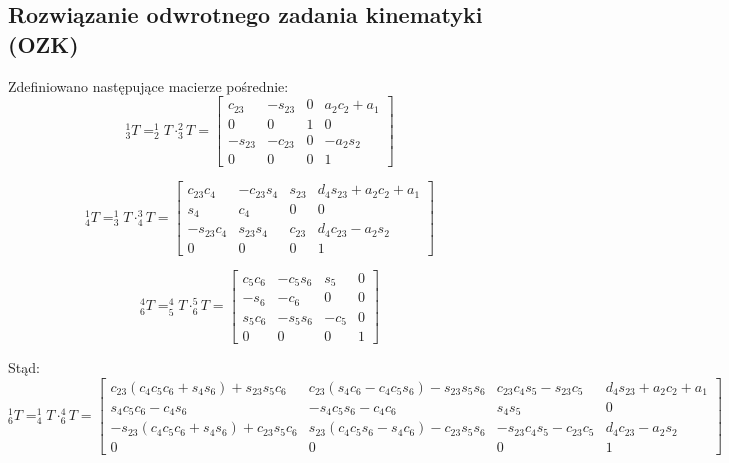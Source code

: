 \documentclass{article}
\begin{document}
\subsection{Rozwiązanie odwrotnego zadania kinematyki (OZK)}

Zdefiniowano następujące macierze po\'srednie:
\[
_{3}^{1}T= _{2}^{1}T \cdot _{3}^{2}T = 
\begin{bmatrix}
c_{23}	&-s_{23}	&0	&a_2c_2+a_1	\\
0		&0		&1	&0			\\
-s_{23}	&-c_{23}	&0	&-a_2s_2		\\
0		&0		&0	&1	
 \end{bmatrix}
\]

\[
_{4}^{1}T= _{3}^{1}T \cdot _{4}^{3}T = 
\begin{bmatrix}
c_{23}c_4	&-c_{23}s_4	&s_{23}	&d_4s_{23}+a_2c_2+a_1	\\
s_4		&c_4		&0		&0			\\
-s_{23}c_4	&s_{23}s_4	&c_{23}	&d_4c_{23}-a_2s_2		\\
0		&0		&0		&1	
 \end{bmatrix}
\]

\[
_{6}^{4}T= _{5}^{4}T \cdot _{6}^{5}T = 
\begin{bmatrix}
c_5c_6	&-c_5s_6	&s_5	&0	\\
-s_6		&-c_6		&0	&0	\\
s_5c_6	&-s_5s_6	&-c_5	&0	\\
0		&0		&0	&1	
 \end{bmatrix}
\]

Stąd:
\[
_{6}^{1}T= _{4}^{1}T \cdot _{6}^{4}T = 
\begin{bmatrix}
c_{23}(c_4c_5c_6+s_4s_6)+s_{23}s_5c_6	&c_{23}(s_4c_6-c_4c_5s_6)-s_{23}s_5s_6	&c_{23}c_4s_5-s_{23}c_5	&d_4s_{23}+a_2c_2+a_1	\\
s_4c_5c_6-c_4s_6					&-s_4c_5s_6-c_4c_6				&s_4s_5				&0				\\
-s_{23}(c_4c_5c_6+s_4s_6)+c_{23}s_5c_6	&s_{23}(c_4c_5s_6-s_4c_6)-c_{23}s_5s_6	&-s_{23}c_4s_5-c_{23}c_5	&d_4c_{23}-a_2s_2	\\
0							&0							&0					&1	
 \end{bmatrix}
\]
\end{document}

